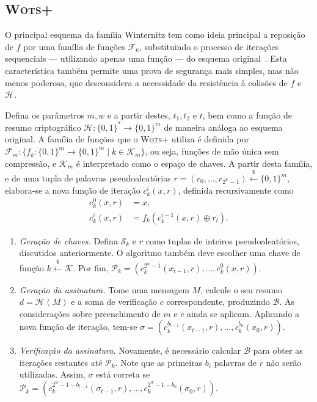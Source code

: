 \documentclass[12pt,notitlepage]{report}
\newcommand{\hh}{\mathcal{H}}
\newcommand{\pk}{\mathcal{P}_k}
\newcommand{\sk}{\mathcal{S}_k}
\newcommand{\hash}[2][]{\mathcal{H}^{#1}(#2)}
\newcommand{\binwds}[1]{\{0, 1\}^{#1}}
\newcommand{\fhash}[1]{\hh{} : \binwds{*} \longrightarrow \binwds{#1}}
\newcommand{\wotsplus}{\textsc{Wots+}}
\begin{document}
\subsection{\wotsplus{}}
\label{subsection:wotsplus}

O principal esquema da família Winternitz tem como ideia principal a
reposição de $f$ por uma família de funções $\mathcal{F}_k$, substituindo o
processo de iterações sequenciais --- utilizando apenas uma função --- do
esquema original~\cite{Hlsing2013}. Esta característica também permite uma
prova de segurança mais simples, mas não menos poderosa, que desconsidera a
necessidade da resistência à colisões de $f$ e $\hh{}$.

Defina os parâmetros $m, w$ e a partir destes, $t_1, t_2 \text{ e } t$, bem
como a função de resumo criptográfico $\fhash{m}$ de maneira análoga ao esquema
original. A família de funções que o \wotsplus{} utiliza é definida por
$\mathcal{F}_m : \{f_k : \binwds{m} \longrightarrow \binwds{m} \mid k \in
\mathcal{K}_m\}$, ou seja, funções de mão única sem compressão, e
$\mathcal{K}_m$ é interpretado como o espaço de chaves. A partir desta família,
e de uma tupla de palavras pseudoaleatórias $r = (r_0, \dots, r_{2^w - 1})
\stackrel{\$}{\longleftarrow} \binwds{m}$, elabora-se a nova função de iteração
$c^{i}_{k}(x, r)$, definida recursivamente como
\begin{equation}
  \begin{split}
    c^{0}_{k}(x, r) &= x, \\
    c^{i}_{k}(x, r) &= f_k(c^{i-1}_{k}(x, r) \oplus r_i).
  \end{split}
\end{equation}

\begin{enumerate}

  \item[] \emph{Geração de chaves.} Defina $\sk{}$ e $r$ como tuplas de
      inteiros pseudoaleatórios, discutidos anteriormente. O algoritmo também
        deve escolher uma chave de função $k \stackrel{\$}\longleftarrow
        \mathcal{K}$. Por fim, $\pk{} = (c^{2^w-1}_{k}(x_{t-1}, r), \dots,
        c^{0}_{k}(x, r))$.

  \item[] \emph{Geração da assinatura.} Tome uma mensagem $M$, calcule o seu
      resumo $d = \hash{M}$ e a soma de verificação $c$ correspondente,
        produzindo $\mathcal{B}$. As considerações sobre preenchimento de $m$ e
        $c$ ainda se aplicam. Aplicando a nova função de iteração, tem-se
        $\sigma = (c^{b_{t - 1}}_{k}(x_{t-1}, r), \dots, c^{b_{0}}_{k}(x_{0},
        r))$.

  \item[] \emph{Verificação da assinatura.} Novamente, é necessário calcular
      $\mathcal{B}$ para obter as iterações restantes até $\pk{}$. Note que as
        primeiras $b_i$ palavras de $r$ não serão utilizadas. Assim, $\sigma$
        está correta se $\pk{} = (c^{2^{w} - 1 - b_{t - 1}}_{k}(\sigma_{t-1},
        r), \dots, c^{2^{w} - 1 - b_{0}}_{k}(\sigma_{0}, r))$.

\end{enumerate}
\end{document}

